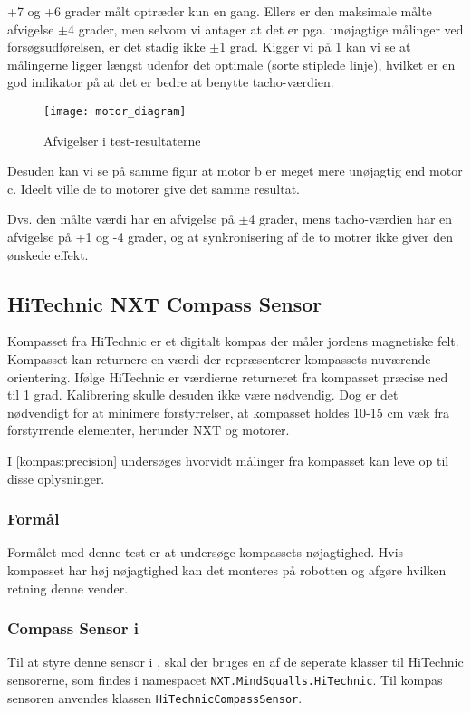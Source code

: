 +7 og +6 grader målt optræder kun en gang.
Ellers er den maksimale målte afvigelse $\pm$4 grader, men selvom vi antager at det er pga. unøjagtige målinger ved forsøgsudførelsen, er det stadig ikke $\pm$1 grad.
Kigger vi på \cref{sensor:motor_sensor_diagram} kan vi se at målingerne ligger længst udenfor det optimale (sorte stiplede linje), hvilket er en god indikator på at det er bedre at benytte tacho-værdien.

\begin{figure}
\texttt{[image: motor\_diagram]}
\caption{Afvigelser i test-resultaterne}
\label{sensor:motor_sensor_diagram}
\end{figure}

Desuden kan vi se på samme figur at motor b er meget mere unøjagtig end motor c.
Ideelt ville de to motorer give det samme resultat.

Dvs. den målte værdi har en afvigelse på $\pm$4 grader, mens tacho-værdien har en afvigelse på +1 og -4 grader, og at synkronisering af de to motrer ikke giver den ønskede effekt.

\subsection{HiTechnic NXT Compass Sensor}
Kompasset fra HiTechnic er et digitalt kompas der måler jordens magnetiske felt.
Kompasset kan returnere en værdi der repræsenterer kompassets nuværende orientering.
Ifølge HiTechnic er værdierne returneret fra kompasset præcise ned til 1 grad.
Kalibrering skulle desuden ikke være nødvendig.
Dog er det nødvendigt for at minimere forstyrrelser, at kompasset holdes 10-15 cm væk fra forstyrrende elementer, herunder \lego NXT og motorer.\cite{hitechnic_compass}

I \cref{kompas:precision} undersøges hvorvidt målinger fra kompasset kan leve op til disse oplysninger.

\subsubsection{Formål}
Formålet med denne test er at undersøge kompassets nøjagtighed.
Hvis kompasset har høj nøjagtighed kan det monteres på robotten og afgøre hvilken retning denne vender.

\subsubsection{Compass Sensor i \mindsqualls}
Til at styre denne sensor i \mindsqualls, skal der bruges en af de seperate klasser til HiTechnic sensorerne, som findes i namespacet \lstinline[style=csharp]!NXT.MindSqualls.HiTechnic!.
Til kompas sensoren anvendes klassen \lstinline[style=csharp]!HiTechnicCompassSensor!.


